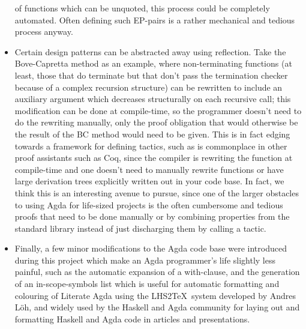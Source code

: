 \documentclass[a4paper]{article}
\begin{document}
\begin{itemize}
of functions which can be unquoted, this process could be completely
automated. Often defining such EP-pairs is a rather mechanical and
tedious process anyway.
  \item Certain design patterns can be abstracted away using
reflection. Take the Bove-Capretta method as an example, where
non-terminating functions (at least, those that do terminate but that
don't pass the termination checker because of a complex recursion
structure) can be rewritten to include an auxiliary argument which
decreases structurally on each recursive call; this modification can be done at compile-time, so the programmer doesn't
need to do the rewriting manually, only the proof obligation that
would otherwise be
the result of the BC method would need to be given.  This is in fact
edging towards a framework for defining tactics, such as is
commonplace in other proof assistants such as Coq, since the
compiler is rewriting the function at compile-time and one doesn't
need to manually rewrite functions or have large derivation trees
explicitly written out in your code base.  In fact, we think this is
an interesting avenue to pursue, since one of the larger obstacles to
using Agda for life-sized projects is the often cumbersome and tedious
proofs that need to be done manually or by combining properties from
the standard library instead of just discharging them by calling a
tactic.
  \item Finally, a few minor modifications to the Agda code base were
introduced during this project which make an Agda programmer's life
slightly less painful, such as the automatic expansion of a
with-clause, and the generation of an in-scope-symbols list which is
useful for automatic formatting and colouring of Literate Agda using
the LHS2\TeX\ system developed by Andres L\"oh, and widely used by the
Haskell and Agda community for laying out and formatting Haskell and
Agda code in articles and presentations.
\end{itemize}




{}

\end{document}
